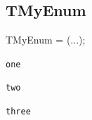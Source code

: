 \documentclass{report}
\newif\ifpdf
\begin{document}
\subsection*{TMyEnum}
\fi
\label{ok_type_helpers-TMyEnum}
\begin{list}{}{
\setlength{\itemindent}{0cm}
\setlength{\listparindent}{0cm}
\setlength{\leftmargin}{\evensidemargin}
\addtolength{\leftmargin}{\tmplength}
\settowidth{\labelsep}{X}
\addtolength{\leftmargin}{\labelsep}
\setlength{\labelwidth}{\tmplength}
}
\item[\textbf{Declaration}\hfill]
\ifpdf
\begin{flushleft}
\fi
\begin{ttfamily}
TMyEnum = (...);\end{ttfamily}

\ifpdf
\end{flushleft}
\fi

\par
\item[\textbf{Description}]
 \item[\textbf{Values}]
\begin{description}
\item[\texttt{one}] \label{ok_type_helpers-one}
\index{}
 
\item[\texttt{two}] \label{ok_type_helpers-two}
\index{}
 
\item[\texttt{three}] \label{ok_type_helpers-three}
\index{}
 
\end{description}


\end{list}
\end{document}
